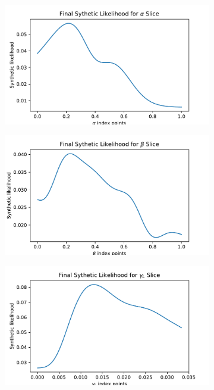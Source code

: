 \begin{figure}[htbp]
    \centering
    \begin{subfigure}[b]{0.5\textwidth}
        \centering
        \includegraphics[width=\textwidth]{../champagne_GP_images/alpha_slice_500_synth_likelihood.pdf}
    \end{subfigure}%
    \hfill%
    \begin{subfigure}[b]{0.5\textwidth}
        \centering
        \includegraphics[width=\textwidth]{../champagne_GP_images/beta_slice_500_synth_likelihood.pdf}
    \end{subfigure}
    \begin{subfigure}[b]{0.5\textwidth}
        \centering
        \includegraphics[width=\textwidth]{../champagne_GP_images/gamma_L_slice_500_synth_likelihood.pdf}

\end{subfigure}
\end{figure}
